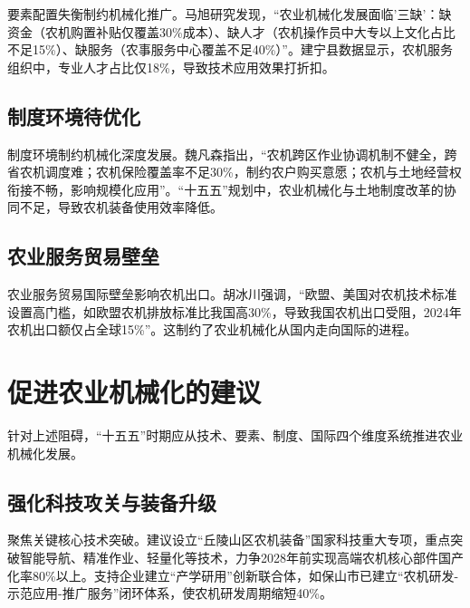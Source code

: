 \documentclass[12pt,fontset=windows]{ctexart}
\begin{document}
要素配置失衡制约机械化推广。马旭研究发现，“农业机械化发展面临'三缺'：缺资金（农机购置补贴仅覆盖30\%成本）、缺人才（农机操作员中大专以上文化占比不足15\%）、缺服务（农事服务中心覆盖不足40\%）”\cite{MaXuXinZhiShengChanLiQuDongNongYeNongCunXianDaiHuaJiLiZuZhiYuYouHua2025}。建宁县数据显示，农机服务组织中，专业人才占比仅18\%，导致技术应用效果打折扣。

\subsection{制度环境待优化}

制度环境制约机械化深度发展。魏凡森指出，“农机跨区作业协调机制不健全，跨省农机调度难；农机保险覆盖率不足30\%，制约农户购买意愿；农机与土地经营权衔接不畅，影响规模化应用”\cite{WeiFanSenNongYeYuQuYuJingJiRongHeFaZhanDeCuoShiTanTao2025}。“十五五”规划中，农业机械化与土地制度改革的协同不足，导致农机装备使用效率降低。

\subsection{农业服务贸易壁垒}

农业服务贸易国际壁垒影响农机出口。胡冰川强调，“欧盟、美国对农机技术标准设置高门槛，如欧盟农机排放标准比我国高30\%，导致我国农机出口受阻，2024年农机出口额仅占全球15\%”\cite{HuBingChuanNongYeFuWuMaoYiYuQuanQiuNongYeGeJuChongSuShiWuWuShiQiZhongGuoDeZhanLueJiYu2025}。这制约了农业机械化从国内走向国际的进程。

\section{促进农业机械化的建议}

针对上述阻碍，“十五五”时期应从技术、要素、制度、国际四个维度系统推进农业机械化发展。

\subsection{强化科技攻关与装备升级}

聚焦关键核心技术突破。建议设立“丘陵山区农机装备”国家科技重大专项，重点突破智能导航、精准作业、轻量化等技术，力争2028年前实现高端农机核心部件国产化率80\%以上\cite{LiJinKaiRenGongZhiNengFuNengNongYeLuSeZhuanXingDeZuoYongJiZhiXianShiKunJingYuTuiJinLuJing2025}。支持企业建立“产学研用”创新联合体，如保山市已建立“农机研发-示范应用-推广服务”闭环体系，使农机研发周期缩短40\%\cite{FuHuaPingShenGengWoYeJiXianXingWoShiYiNongJiHuaGaiGeHuiJiuNongYeZhenXingXinTuJing2025}。
\end{document}
